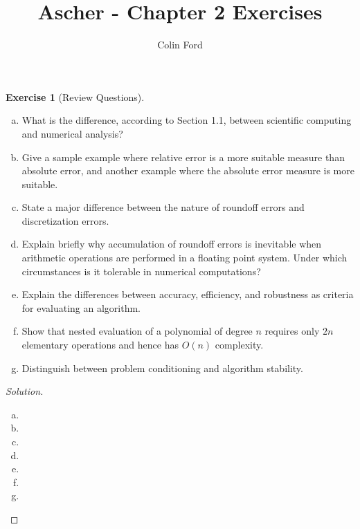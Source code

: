 \documentclass[12pt,a4]{article}
\author{Colin Ford}
\title{Ascher - Chapter 2 Exercises}
\date{}
\theoremstyle{definition}
\newtheorem{exercise}{Exercise}
\begin{document}
\maketitle

\begin{exercise}[Review Questions]
	\begin{enumerate}[(a)]
		\item What is the difference, according to Section 1.1, between scientific computing and numerical analysis?
		
		\item Give a sample example where relative error is a more suitable measure than absolute error, and another example where the absolute error measure is more suitable. 
		
		\item State a major difference between the nature of roundoff errors and discretization errors.
		
		\item Explain briefly why accumulation of roundoff errors is inevitable when arithmetic operations are performed in a floating point system. Under which circumstances is it tolerable in numerical computations?
		
		\item Explain the differences between accuracy, efficiency, and robustness as criteria for evaluating an algorithm.
		
		\item Show that nested evaluation of a polynomial of degree $n$ requires only $2n$ elementary operations and hence has $O(n)$ complexity.
		
		\item Distinguish between problem conditioning and algorithm stability.
		
	\end{enumerate}
\end{exercise}
\begin{proof}[Solution]
	\begin{enumerate}[(a)]
		\item 
		
		\item 
		
		\item 
		
		\item 
		
		\item 
		
		\item 
		
		\item 
		
	\end{enumerate}
\end{proof}
\end{document}
